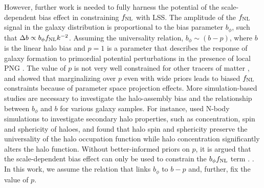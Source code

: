 However, further work is needed to fully harness the potential of the scale-dependent bias effect in constraining $f_{\rm NL}$ with LSS. The amplitude of the $f_{\rm NL}$ signal in the galaxy distribution is proportional to the bias parameter $b_{\phi}$, such that $\Delta b \propto b_{\phi}f_{\rm NL} k^{-2}$. Assuming the universality relation, $b_{\phi} \sim (b - p)$, where $b$ is the linear halo bias and $p=1$ is a parameter that describes the response of galaxy formation to primordial potential perturbations in the presence of local PNG \citep[see, e.g.,][]{slosar2008constraints}. The value of $p$ is not very well constrained for other tracers of matter \citep{2020JCAP...12..013B, 2020JCAP...12..031B}, and \cite{2022JCAP...11..013B} showed that marginalizing over $p$ even with wide priors leads to biased $f_{\rm NL}$ constraints because of parameter space projection effects. More simulation-based studies are necessary to investigate the halo-assembly bias and the relationship between $b_{\phi}$ and $b$ for various galaxy samples. For instance, \cite{2023JCAP...01..023L} used N-body simulations to investigate secondary halo properties, such as concentration, spin and sphericity of haloes, and found that halo spin and sphericity preserve the universality of the halo occupation function while halo concentration significantly alters the halo function.  Without better-informed priors on $p$, it is argued that the scale-dependent bias effect can only be used to constrain the $b_{\phi}f_{\rm NL}$ term \citep[see, e.g.,][]{2020JCAP...12..031B}. . In this work, we assume the  relation that links $b_{\phi}$ to $b-p$ and, further, fix the value of $p$.  

